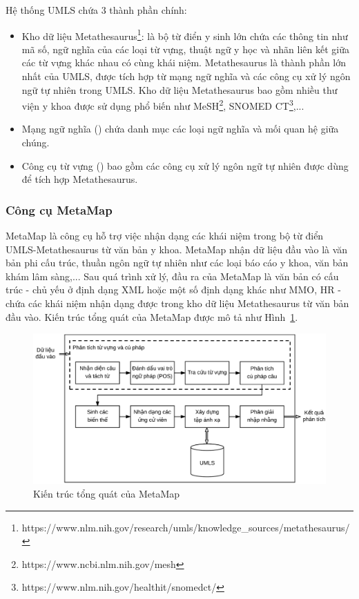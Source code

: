 Hệ thống UMLS chứa 3 thành phần chính:
\begin{itemize}
\item Kho dữ liệu Metathesaurus\footnote{https://www.nlm.nih.gov/research/umls/knowledge\_sources/metathesaurus/}: là bộ từ điển y sinh lớn chứa các thông tin như mã số, ngữ nghĩa của các loại từ vựng, thuật ngữ y học và nhãn liên kết giữa các từ vựng khác nhau có cùng khái niệm. Metathesaurus là thành phần lớn nhất của UMLS, được tích hợp từ mạng ngữ nghĩa và các công cụ xử lý ngôn ngữ tự nhiên trong UMLS. Kho dữ liệu Metathesaurus bao gồm nhiều thư viện y khoa được sử dụng phổ biến như MeSH\footnote{https://www.ncbi.nlm.nih.gov/mesh}, SNOMED CT\footnote{https://www.nlm.nih.gov/healthit/snomedct/},...
\item Mạng ngữ nghĩa () chứa danh mục các loại ngữ nghĩa và mối quan hệ giữa chúng.
\item Công cụ từ vựng () bao gồm các công cụ xử lý ngôn ngữ tự nhiên được dùng để tích hợp Metathesaurus.
\end{itemize}

\subsubsection*{Công cụ MetaMap}
MetaMap là công cụ hỗ trợ việc nhận dạng các khái niệm trong bộ từ điển UMLS-Metathesaurus từ văn bản y khoa. MetaMap nhận dữ liệu đầu vào là văn bản phi cấu trúc, thuần ngôn ngữ tự nhiên như các loại báo cáo y khoa, văn bản khám lâm sàng,... Sau quá trình xử lý, đầu ra của MetaMap là văn bản có cấu trúc - chủ yếu ở định dạng XML hoặc một số định dạng khác như MMO, HR - chứa các khái niệm nhận dạng được trong kho dữ liệu Metathesaurus từ văn bản đầu vào. Kiến trúc tổng quát của MetaMap được mô tả như Hình~\ref{fig:kientrucmetamap}.\\

\begin{figure}[h]
\centering
\includegraphics[scale=0.52]{../hinh/KienTrucMetamap.png}
\caption{Kiến trúc tổng quát của MetaMap \cite{Aronson2010}} \label{fig:kientrucmetamap}
\end{figure}

